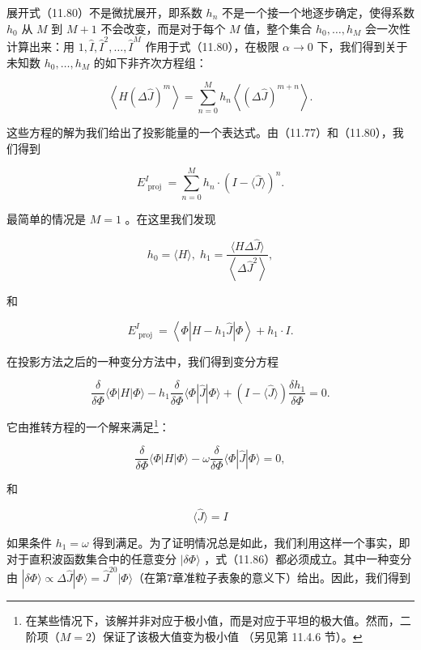 展开式（11.80）不是微扰展开，即系数 ${h}_{n}$ 不是一个接一个地逐步确定，使得系数 ${h}_{0}$ 从 $M$
到 $M+1$ 不会改变，而是对于每个 $M$ 值，整个集合 ${h}_{0},\ldots,{h}_{M}$ 会一次性计算出来：用
$1,\widehat{I},{\widehat{I}}^{2},\ldots,{\widehat{I}}^{M}$ 作用于式（11.80），在极限
$\alpha\rightarrow0$ 下，我们得到关于未知数 ${h}_{0},\ldots,{h}_{M}$ 的如下非齐次方程组：

\[
\left\langle {H{\left(\Delta\widehat{J}\right)}^{m}}\right\rangle =\mathop{\sum}\limits^{M}_{{n=0}}{h}_{n}\left\langle {\left(\Delta\widehat{J}\right)}^{m+n}\right\rangle .\tag{11.81}
\]

这些方程的解为我们给出了投影能量的一个表达式。由（11.77）和（11.80），我们得到

\[
{E}^{I}_{\text{ proj }}=\mathop{\sum}\limits^{M}_{{n=0}}{h}_{n}\cdot{\left(I-\langle\widehat{J}\rangle\right)}^{n}.\tag{11.82}
\]

最简单的情况是 $M=1$ 。在这里我们发现

\[
{h}_{0}=\langle H\rangle,\;{h}_{1}=\frac{\langle{H\Delta}\widehat{J}\rangle}{\left\langle \Delta{\widehat{J}}^{2}\right\rangle },\tag{11.83}
\]

和

\[
{E}^{I}_{\text{ proj }}=\left\langle {\Phi\left|{H-{h}_{1}\widehat{J}}\right|\Phi}\right\rangle +{h}_{1}\cdot I.\tag{11.84}
\]

在投影方法之后的一种变分方法中，我们得到变分方程

\[
\frac{\delta}{\delta\Phi}\langle\Phi\left|H\right|\Phi\rangle-{h}_{1}\frac{\delta}{\delta\Phi}\langle\Phi\left|\widehat{J}\right|\Phi\rangle+\left({I-\langle\widehat{J}\rangle}\right)\frac{\delta{h}_{1}}{\delta\Phi}=0.\tag{11.85}
\]

它由推转方程的一个解来满足\footnote{在某些情况下，该解并非对应于极小值，而是对应于平坦的极大值。然而，二阶项（$M=2$）保证了该极大值变为极小值 \cite{BMR70}（另见第
11.4.6 节）。}：

\[
\frac{\delta}{\delta\Phi}\langle\Phi|H|\Phi\rangle-\omega\frac{\delta}{\delta\Phi}\langle\Phi|\hat{J}|\Phi\rangle=0,\tag{11.86}
\]

和

\[
\langle\widehat{J}\rangle=I
\]

如果条件 ${h}_{1}=\omega$ 得到满足。为了证明情况总是如此，我们利用这样一个事实，即对于直积波函数集合中的任意变分
$|{\delta\Phi}\rangle$ ，式（11.86）都必须成立。其中一种变分由 $|\delta\Phi\rangle\propto\Delta\widehat{J}|\Phi\rangle=\widehat{J}^{20}|\Phi\rangle$（在第7章准粒子表象的意义下）给出。因此，我们得到

